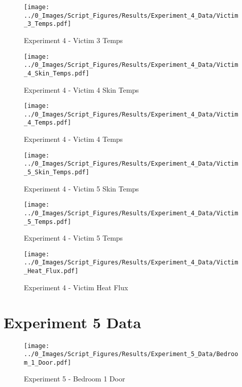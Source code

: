 	\clearpage

	\begin{figure}[H]
		\centering
		\texttt{[image: ../0\_Images/Script\_Figures/Results/Experiment\_4\_Data/Victim\_3\_Temps.pdf]}
		\caption[]{Experiment 4 - Victim 3 Temps}
	\end{figure}
 

	\begin{figure}[H]
		\centering
		\texttt{[image: ../0\_Images/Script\_Figures/Results/Experiment\_4\_Data/Victim\_4\_Skin\_Temps.pdf]}
		\caption[]{Experiment 4 - Victim 4 Skin Temps}
	\end{figure}
 
	\clearpage

	\begin{figure}[H]
		\centering
		\texttt{[image: ../0\_Images/Script\_Figures/Results/Experiment\_4\_Data/Victim\_4\_Temps.pdf]}
		\caption[]{Experiment 4 - Victim 4 Temps}
	\end{figure}
 

	\begin{figure}[H]
		\centering
		\texttt{[image: ../0\_Images/Script\_Figures/Results/Experiment\_4\_Data/Victim\_5\_Skin\_Temps.pdf]}
		\caption[]{Experiment 4 - Victim 5 Skin Temps}
	\end{figure}
 
	\clearpage

	\begin{figure}[H]
		\centering
		\texttt{[image: ../0\_Images/Script\_Figures/Results/Experiment\_4\_Data/Victim\_5\_Temps.pdf]}
		\caption[]{Experiment 4 - Victim 5 Temps}
	\end{figure}
 

	\begin{figure}[H]
		\centering
		\texttt{[image: ../0\_Images/Script\_Figures/Results/Experiment\_4\_Data/Victim\_Heat\_Flux.pdf]}
		\caption[]{Experiment 4 - Victim Heat Flux}
	\end{figure}
 
	\clearpage

\clearpage		\large
\section{Experiment 5 Data} \label{App:Exp5Results} 

	\begin{figure}[H]
		\centering
		\texttt{[image: ../0\_Images/Script\_Figures/Results/Experiment\_5\_Data/Bedroom\_1\_Door.pdf]}
		\caption[]{Experiment 5 - Bedroom 1 Door}
	\end{figure}
 

